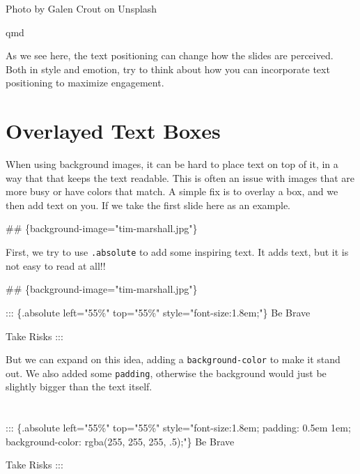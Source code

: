\documentclass[
  letterpaper,
  DIV=11,
  numbers=noendperiod]{scrreprt}
\newenvironment{Shaded}{\begin{snugshade}}{\end{snugshade}}
\newcommand{\FunctionTok}[1]{\textcolor[rgb]{0.28,0.35,0.67}{#1}}
\newcommand{\NormalTok}[1]{\textcolor[rgb]{0.00,0.23,0.31}{#1}}
\begin{document}
Photo by Galen Crout on Unsplash

qmd

As we see here, the text positioning can change how the slides are
perceived. Both in style and emotion, try to think about how you can
incorporate text positioning to maximize engagement.

\section{Overlayed Text Boxes}\label{overlayed-text-boxes}

When using background images, it can be hard to place text on top of it,
in a way that that keeps the text readable. This is often an issue with
images that are more busy or have colors that match. A simple fix is to
overlay a box, and we then add text on you. If we take the first slide
here as an example.

\begin{Shaded}
\begin{Highlighting}[]
\FunctionTok{\#\# \{background{-}image="tim{-}marshall.jpg"\}}
\end{Highlighting}
\end{Shaded}

First, we try to use \texttt{.absolute} to add some inspiring text. It
adds text, but it is not easy to read at all!!

\begin{Shaded}
\begin{Highlighting}[]
\FunctionTok{\#\# \{background{-}image="tim{-}marshall.jpg"\}}

\NormalTok{::: \{.absolute left="55\%" top="55\%" style="font{-}size:1.8em;"\}}
\NormalTok{Be Brave}

\NormalTok{Take Risks}
\NormalTok{:::}
\end{Highlighting}
\end{Shaded}

But we can expand on this idea, adding a \texttt{background-color} to
make it stand out. We also added some \texttt{padding}, otherwise the
background would just be slightly bigger than the text itself.

\section{}\label{section}

\begin{Shaded}
\begin{Highlighting}[]
\NormalTok{::: \{.absolute left="55\%" top="55\%" style="font{-}size:1.8em; padding: 0.5em 1em; background{-}color: rgba(255, 255, 255, .5);"\}}
\NormalTok{Be Brave}

\NormalTok{Take Risks}
\NormalTok{:::}
\end{Highlighting}
\end{Shaded}
\end{document}
